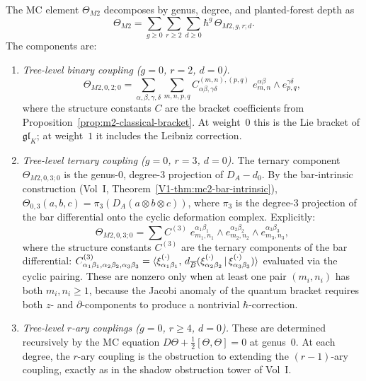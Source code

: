\begin{theorem}
The MC element $\Theta_{M2}$ decomposes by genus, degree, and
planted-forest depth as
\begin{equation}%
\Theta_{M2}
= \sum_{g\ge 0}\sum_{r\ge 2}\sum_{d\ge 0}
\hbar^g\,\Theta_{M2,g,r;d}.
\end{equation}
The components are:
\begin{enumerate}[label=(\roman*),leftmargin=1.8em]
\item \emph{Tree-level binary coupling ($g=0$, $r=2$, $d=0$).}
\begin{equation}%
\Theta_{M2,0,2;0}
= \sum_{\alpha,\beta,\gamma,\delta}
\sum_{m,n,p,q}
C^{(m,n),(p,q)}_{\alpha\beta,\gamma\delta}\;
e^{\alpha\beta}_{m,n}\wedge e^{\gamma\delta}_{p,q},
\end{equation}
where the structure constants $C$ are the bracket
coefficients from Proposition~\ref{prop:m2-classical-bracket}.
At weight~$0$ this is the Lie bracket of $\mathfrak{gl}_K$;
at weight~$1$ it includes the Leibniz correction.

\item \emph{Tree-level ternary coupling ($g=0$, $r=3$, $d=0$).}
The ternary component $\Theta_{M2,0,3;0}$ is the genus-$0$,
degree-$3$ projection of $D_A - d_0$. By the bar-intrinsic
construction (Vol~I, Theorem~\ref*{V1-thm:mc2-bar-intrinsic}),
$\Theta_{0,3}(a,b,c) = \pi_3(D_A(a\otimes b\otimes c))$,
where $\pi_3$ is the degree-$3$ projection of the bar differential
onto the cyclic deformation complex. Explicitly:
\begin{equation}%
\Theta_{M2,0,3;0}
= \sum C^{(3)}\;
e^{\alpha_1\beta_1}_{m_1,n_1}\wedge
e^{\alpha_2\beta_2}_{m_2,n_2}\wedge
e^{\alpha_3\beta_3}_{m_3,n_3},
\end{equation}
where the structure constants $C^{(3)}$ are the ternary
components of the bar differential:
$C^{(3)}_{\alpha_1\beta_1,\alpha_2\beta_2,\alpha_3\beta_3}
= \langle \xi^{(\cdot)}_{\alpha_1\beta_1},\,
d_{\overline{B}}(\xi^{(\cdot)}_{\alpha_2\beta_2}
\,|\,\xi^{(\cdot)}_{\alpha_3\beta_3})\rangle$
evaluated via the cyclic pairing. These are nonzero only
when at least one pair $(m_i,n_i)$ has both $m_i,n_i\ge 1$,
because the Jacobi anomaly of the quantum bracket requires
both $z$- and $\partial$-components to produce a nontrivial
$\hbar$-correction.

\item \emph{Tree-level $r$-ary couplings ($g=0$, $r\ge 4$, $d=0$).}
These are determined recursively by the MC equation
$D\Theta + \tfrac{1}{2}[\Theta,\Theta]=0$ at genus~$0$.
At each degree, the $r$-ary coupling is the obstruction
to extending the $(r-1)$-ary coupling, exactly as in
the shadow obstruction tower of Vol~I.


\end{enumerate}
\end{theorem}
